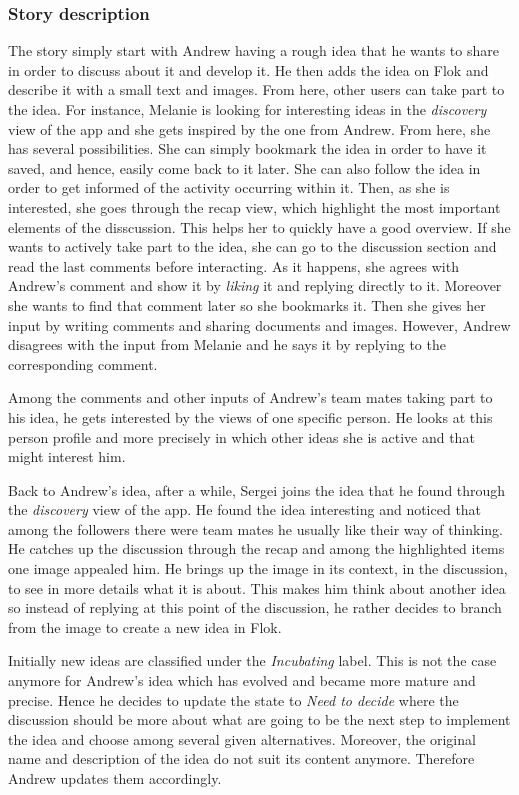 \documentclass[a4paper,12pt,twoside]{article}
\begin{document}
\FloatBarrier
\subsubsection*{Story description}
The story simply start with Andrew having a rough idea that he wants to share in order to discuss about it and develop it.
He then adds the idea on Flok and describe it with a small text and images.
From here, other users can take part to the idea.
For instance, Melanie is looking for interesting ideas in the \emph{discovery} view of the app and she gets inspired by the one from Andrew.
From here, she has several possibilities.
She can simply bookmark the idea in order to have it saved, and hence, easily come back to it later.
She can also follow the idea in order to get informed of the activity occurring within it.
Then, as she is interested, she goes through the recap view, which highlight the most important elements of the disscussion.
This helps her to quickly have a good overview.
If she wants to actively take part to the idea, she can go to the discussion section and read the last comments before interacting.
As it happens, she agrees with Andrew's comment and show it by \emph{liking} it and replying directly to it.
Moreover she wants to find that comment later so she bookmarks it.
Then she gives her input by writing comments and sharing documents and images.
However, Andrew disagrees with the input from Melanie and he says it by replying to the corresponding comment.

Among the comments and other inputs of Andrew's team mates taking part to his idea, he gets interested by the views of one specific person.
He looks at this person profile and more precisely in which other ideas she is active and that might interest him.

Back to Andrew's idea, after a while, Sergei joins the idea that he found through the \emph{discovery} view of the app.
He found the idea interesting and noticed that among the followers there were team mates he usually like their way of thinking.
He catches up the discussion through the recap and among the highlighted items one image appealed him.
He brings up the image in its context, in the discussion, to see in more details what it is about.
This makes him think about another idea so instead of replying at this point of the discussion, he rather decides to branch from the image to create a new idea in Flok.

Initially new ideas are classified under the \emph{Incubating} label.
This is not the case anymore for Andrew's idea which has evolved and became more mature and precise.
Hence he decides to update the state to \emph{Need to decide} where the discussion should be more about what are going to be the next step to implement the idea and choose among several given alternatives.
Moreover, the original name and description of the idea do not suit its content anymore.
Therefore Andrew updates them accordingly.
\end{document}
